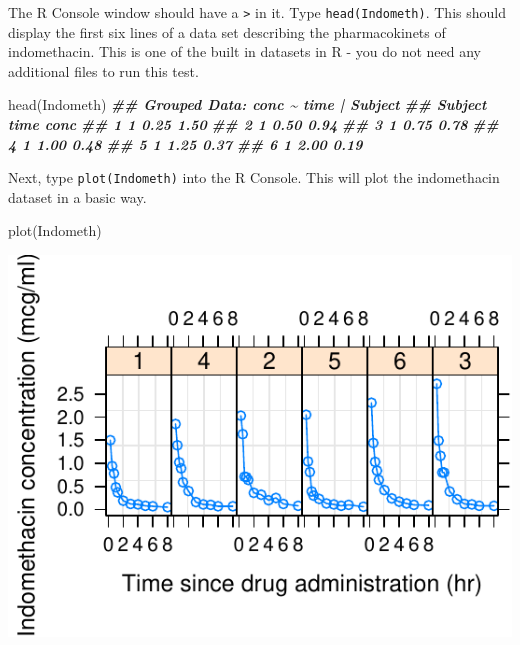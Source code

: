 \documentclass[
]{krantz}
\newenvironment{Shaded}{\begin{snugshade}}{\end{snugshade}}
\newcommand{\DocumentationTok}[1]{\textcolor[rgb]{0.56,0.35,0.01}{\textbf{\textit{#1}}}}
\newcommand{\FunctionTok}[1]{\textcolor[rgb]{0.00,0.00,0.00}{#1}}
\newcommand{\NormalTok}[1]{#1}
\begin{document}
The R Console window should have a \texttt{\textgreater{}} in it. Type \texttt{head(Indometh)}. This should display the first six lines of a data set describing the pharmacokinets of indomethacin. This is one of the built in datasets in R - you do not need any additional files to run this test.

\begin{Shaded}
\begin{Highlighting}[]
\FunctionTok{head}\NormalTok{(Indometh)}
\DocumentationTok{\#\# Grouped Data: conc \textasciitilde{} time | Subject}
\DocumentationTok{\#\#   Subject time conc}
\DocumentationTok{\#\# 1       1 0.25 1.50}
\DocumentationTok{\#\# 2       1 0.50 0.94}
\DocumentationTok{\#\# 3       1 0.75 0.78}
\DocumentationTok{\#\# 4       1 1.00 0.48}
\DocumentationTok{\#\# 5       1 1.25 0.37}
\DocumentationTok{\#\# 6       1 2.00 0.19}
\end{Highlighting}
\end{Shaded}

Next, type \texttt{plot(Indometh)} into the R Console. This will plot the indomethacin dataset in a basic way.

\begin{Shaded}
\begin{Highlighting}[]
\FunctionTok{plot}\NormalTok{(Indometh)}
\end{Highlighting}
\end{Shaded}

\begin{center}\includegraphics[width=1\linewidth]{index_files/figure-latex/unnamed-chunk-8-1} \end{center}
\end{document}
